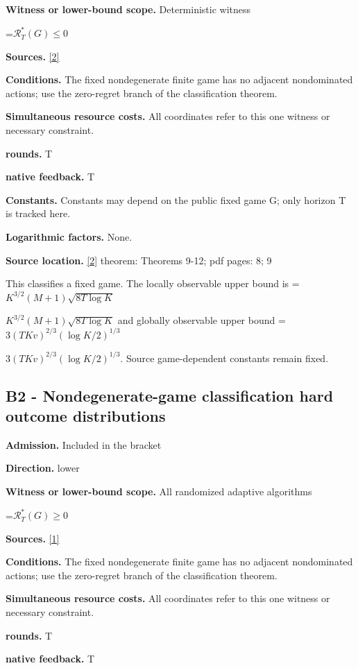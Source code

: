 \documentclass[10pt,a4paper]{article}
\newcommand{\AtlasMath}[1]{\par\begingroup\centering\setbox0=\hbox{$\displaystyle #1$}\ifdim\wd0>1.4\linewidth\typeout{ATLAS WIDE FORMULA: \the\wd0}\fi\ifdim\wd0>\linewidth\resizebox{\linewidth}{!}{\box0}\else\box0\fi\par\endgroup}
\newcommand{\AtlasInlineMath}[1]{\begingroup\setbox0=\hbox{$#1$}\ifdim\wd0>.4\linewidth\endgroup\AtlasMath{#1}\else\endgroup$#1$\fi}
\begin{document}
\textbf{Witness or lower-bound scope.} Deterministic witness

\AtlasMath{\mathcal{R}_T^*(G)\le0}
\textbf{Sources.} \href{https://proceedings.mlr.press/v99/lattimore19a/lattimore19a.pdf}{[2]}

\textbf{Conditions.} The fixed nondegenerate finite game has no adjacent nondominated actions; use the zero-regret branch of the classification theorem.

\textbf{Simultaneous resource costs.} All coordinates refer to this one witness or necessary constraint.

\textbf{rounds.} T

\textbf{native feedback.} T

\textbf{Constants.} Constants may depend on the public fixed game G; only horizon T is tracked here.

\textbf{Logarithmic factors.} None.

\textbf{Source location.} \href{https://proceedings.mlr.press/v99/lattimore19a/lattimore19a.pdf}{[2]} theorem: Theorems 9-12; pdf pages: 8; 9

This classifies a fixed game. The locally observable upper bound is \AtlasInlineMath{K^{3/2}(M+1)\sqrt{8T\log K}} and globally observable upper bound \AtlasInlineMath{3(TKv)^{2/3}(\log K/2)^{1/3}}. Source game-dependent constants remain fixed.

\subsection{B2 - Nondegenerate-game classification hard outcome distributions}
\textbf{Admission.} Included in the bracket

\textbf{Direction.} lower

\textbf{Witness or lower-bound scope.} All randomized adaptive algorithms

\AtlasMath{\mathcal{R}_T^*(G)\ge0}
\textbf{Sources.} \href{https://sites.ualberta.ca/~szepesva/papers/partial_monitoring-mor.pdf}{[1]}

\textbf{Conditions.} The fixed nondegenerate finite game has no adjacent nondominated actions; use the zero-regret branch of the classification theorem.

\textbf{Simultaneous resource costs.} All coordinates refer to this one witness or necessary constraint.

\textbf{rounds.} T

\textbf{native feedback.} T
\end{document}
